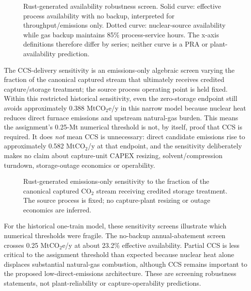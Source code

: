 \begin{figure}[htbp]\centering

\caption{Rust-generated availability robustness screen.  Solid curve: effective process availability with no backup, interpreted for throughput/emissions only.  Dotted curve: nuclear-source availability while gas backup maintains 85\% process-service hours.  The x-axis definitions therefore differ by series; neither curve is a PRA or plant-availability prediction.}
\label{fig:availability-robustness}
\end{figure}

The CCS-delivery sensitivity is an emissions-only algebraic screen varying the fraction of the canonical captured stream that ultimately receives credited capture/storage treatment; the source process operating point is held fixed.  Within this restricted historical sensitivity, even the zero-storage endpoint still avoids approximately 0.388 MtCO$_2$e/y in this narrow model because nuclear heat reduces direct furnace emissions and upstream natural-gas burden.  This means the assignment's 0.25-Mt numerical threshold is not, by itself, proof that CCS is required.  It does \emph{not} mean CCS is unnecessary: direct candidate emissions rise to approximately 0.582 MtCO$_2$/y at that endpoint, and the sensitivity deliberately makes no claim about capture-unit CAPEX resizing, solvent/compression turndown, storage-outage economics or operability.

\begin{figure}[htbp]\centering

\caption{Rust-generated emissions-only sensitivity to the fraction of the canonical captured CO$_2$ stream receiving credited storage treatment.  The source process is fixed; no capture-plant resizing or outage economics are inferred.}
\label{fig:ccs-robustness}
\end{figure}

For the historical one-train model, these sensitivity screens illustrate which numerical thresholds were fragile.  The no-backup annual-abatement screen crosses 0.25 MtCO$_2$e/y at about 23.2\% effective availability.  Partial CCS is less critical to the assignment threshold than expected because nuclear heat alone displaces substantial natural-gas combustion, although CCS remains important to the proposed low-direct-emissions architecture.  These are screening robustness statements, not plant-reliability or capture-operability predictions.

